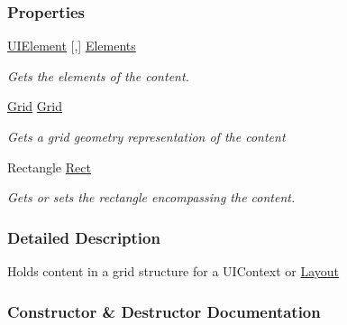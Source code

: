 \subsubsection*{Properties}
\begin{DoxyCompactItemize}
\item 
\hyperlink{class_m_b2_d_1_1_u_i_1_1_u_i_element}{U\+I\+Element} \mbox{[},\mbox{]} \hyperlink{class_m_b2_d_1_1_u_i_1_1_u_i_content_a9af3e2aaae3b3bd4de66403800b82b2e}{Elements}
\begin{DoxyCompactList}\small\item\em Gets the elements of the content. \end{DoxyCompactList}\item 
\hyperlink{class_m_b2_d_1_1_geometry_1_1_grid}{Grid} \hyperlink{class_m_b2_d_1_1_u_i_1_1_u_i_content_ad5593a2cc3e33f7094f1459bb3fc3f24}{Grid}
\begin{DoxyCompactList}\small\item\em Gets a grid geometry representation of the content \end{DoxyCompactList}\item 
Rectangle \hyperlink{class_m_b2_d_1_1_u_i_1_1_u_i_content_af2f7f9e8f8944afab658b3a1f2f94cd0}{Rect}
\begin{DoxyCompactList}\small\item\em Gets or sets the rectangle encompassing the content. \end{DoxyCompactList}\end{DoxyCompactItemize}


\subsubsection{Detailed Description}
Holds content in a grid structure for a U\+I\+Context or \hyperlink{class_m_b2_d_1_1_u_i_1_1_layout}{Layout} 



\subsubsection{Constructor \& Destructor Documentation}
\hypertarget{class_m_b2_d_1_1_u_i_1_1_u_i_content_a80e7f519af0f835fa9912ffa49d76e48}{}\label{class_m_b2_d_1_1_u_i_1_1_u_i_content_a80e7f519af0f835fa9912ffa49d76e48} 
